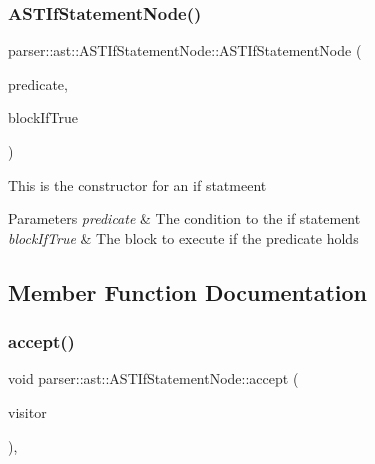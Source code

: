 \subsubsection{\texorpdfstring{A\+S\+T\+If\+Statement\+Node()}{ASTIfStatementNode()}\hspace{0.1cm}{\footnotesize\ttfamily [2/2]}}
{\footnotesize\ttfamily parser\+::ast\+::\+A\+S\+T\+If\+Statement\+Node\+::\+A\+S\+T\+If\+Statement\+Node (\begin{DoxyParamCaption}\item[{std\+::unique\+\_\+ptr$<$ \hyperlink{classparser_1_1ast_1_1ASTExprNode}{A\+S\+T\+Expr\+Node} $>$}]{predicate,  }\item[{std\+::unique\+\_\+ptr$<$ \hyperlink{classparser_1_1ast_1_1ASTBlockStatementNode}{A\+S\+T\+Block\+Statement\+Node} $>$}]{block\+If\+True }\end{DoxyParamCaption})}

This is the constructor for an if statmeent 
\begin{DoxyParams}{Parameters}
{\em predicate} & The condition to the if statement \\
\hline
{\em block\+If\+True} & The block to execute if the predicate holds \\
\hline
\end{DoxyParams}


\subsection{Member Function Documentation}
\mbox{\label{classparser_1_1ast_1_1ASTIfStatementNode_a946a8196020e5d6c1a51a74d84d98e80}} 
\subsubsection{\texorpdfstring{accept()}{accept()}}
{\footnotesize\ttfamily void parser\+::ast\+::\+A\+S\+T\+If\+Statement\+Node\+::accept (\begin{DoxyParamCaption}\item[{\hyperlink{classvisitor_1_1Visitor}{visitor\+::\+Visitor} $\ast$}]{visitor }\end{DoxyParamCaption})\hspace{0.3cm}{\ttfamily [override]}, {\ttfamily [virtual]}}

